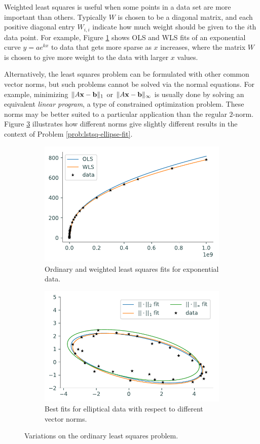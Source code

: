 Weighted least squares is useful when some points in a data set are more important than others.
Typically $W$ is chosen to be a diagonal matrix, and each positive diagonal entry $W_{i,i}$ indicate how much weight should be given to the $i$th data point.
For example, Figure \ref{fig:lstsq-ols-vs-wls} shows OLS and WLS fits of an exponential curve $y = ae^{kx}$ to data that gets more sparse as $x$ increases, where the matrix $W$ is chosen to give more weight to the data with larger $x$ values.

Alternatively, the least squares problem can be formulated with other common vector norms, but such problems cannot be solved via the normal equations.
For example, minimizing $\|A\mathbf{x} - \mathbf{b}\|_1$ or $\|A\mathbf{x} - \mathbf{b}\|_\infty$ is usually done by solving an equivalent \emph{linear program}, a type of constrained optimization problem.
These norms may be better suited to a particular application than the regular $2$-norm.
Figure \ref{fig:lstsq-different-norms} illustrates how different norms give slightly different results in the context of Problem \ref{prob:lstsq-ellipse-fit}.

\begin{figure}[H] %
\captionsetup[subfigure]{justification=centering}
\centering
\begin{subfigure}{.49\textwidth}
    \centering
    \includegraphics[width=.7\textwidth]{figures/weighted_least_squares.pdf}
    \caption{Ordinary and weighted least squares fits for exponential data.}
    \label{fig:lstsq-ols-vs-wls}
\end{subfigure}
%
\begin{subfigure}{.49\textwidth}
    \centering
    \includegraphics[width=.7\textwidth]{figures/various_norm_ellipse.pdf}
    \caption{Best fits for elliptical data with respect to different vector norms.}
    \label{fig:lstsq-different-norms}
\end{subfigure}
\caption{Variations on the ordinary least squares problem.}
\end{figure}

